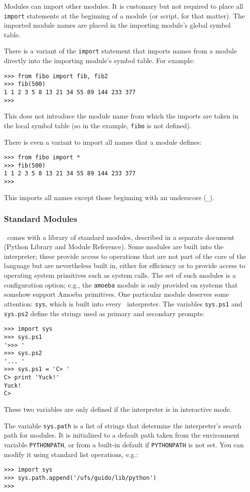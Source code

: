 Modules can import other modules.
It is customary but not required to place all
{\tt import}
statements at the beginning of a module (or script, for that matter).
The imported module names are placed in the importing module's global
symbol table.

There is a variant of the
{\tt import}
statement that imports names from a module directly into the importing
module's symbol table.
For example:
\bcode\begin{verbatim}
>>> from fibo import fib, fib2
>>> fib(500)
1 1 2 3 5 8 13 21 34 55 89 144 233 377
>>> 
\end{verbatim}\ecode
This does not introduce the module name from which the imports are taken
in the local symbol table (so in the example, {\tt fibo} is not
defined).

There is even a variant to import all names that a module defines:
\bcode\begin{verbatim}
>>> from fibo import *
>>> fib(500)
1 1 2 3 5 8 13 21 34 55 89 144 233 377
>>> 
\end{verbatim}\ecode
This imports all names except those beginning with an underscore
({\tt \_}).

\subsubsection{Standard Modules}

\Python\ comes with a library of standard modules, described in a separate
document (Python Library and Module Reference).
Some modules are built into the interpreter; these provide access to
operations that are not part of the core of the language but are
nevertheless built in, either for efficiency or to provide access to
operating system primitives such as system calls.
The set of such modules is a configuration option; e.g., the
{\tt amoeba}
module is only provided on systems that somehow support Amoeba
primitives.
One particular module deserves some attention:
{\tt sys},
which is built into every \Python\ interpreter.
The variables
{\tt sys.ps1}
and
{\tt sys.ps2}
define the strings used as primary and secondary prompts:
\bcode\begin{verbatim}
>>> import sys
>>> sys.ps1
'>>> '
>>> sys.ps2
'... '
>>> sys.ps1 = 'C> '
C> print 'Yuck!'
Yuck!
C> 
\end{verbatim}\ecode
These two variables are only defined if the interpreter is in
interactive mode.

The variable
{\tt sys.path}
is a list of strings that determine the interpreter's search path for
modules.
It is initialized to a default path taken from the environment variable
{\tt PYTHONPATH},
or from a built-in default if
{\tt PYTHONPATH}
is not set.
You can modify it using standard list operations, e.g.:
\bcode\begin{verbatim}
>>> import sys
>>> sys.path.append('/ufs/guido/lib/python')
>>> 
\end{verbatim}\ecode

